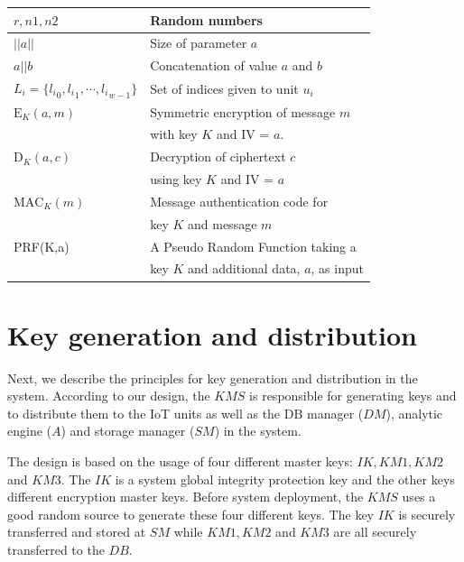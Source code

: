 {\begin{table}[th]
\begin{tabular}{||l|l||}
$r,n1,n2$ & Random numbers \\ \hline
$||a|| $ & Size of parameter $a$\\ \hline
$a||b$ & Concatenation of value $a$ and $b$ \\ \hline
$L_i = \{{l_i}_0, {l_i}_1,\cdots, {l_i}_{w-1}\}$ & Set of indices given to unit $u_i$ \\ \hline
$\text{E}_K(a,m)$ & Symmetric encryption of message $m$ \\
& with key $K$ and IV = $a$. \\ \hline
$\text{D}_{K}(a,c)$ & Decryption of ciphertext $c$ \\
& using key $K$ and IV = $a$\\ \hline
$\text{MAC}_K(m)$ & Message authentication code for \\
& key $K$ and message $m$ \\ \hline
PRF(K,a) & A Pseudo Random Function taking a \\ 
& key $K$ and additional data, $a$, as input \\ \hline
\end{tabular}
\end{table}

\graphicspath{{KeyManagement/images/}}
\section{Key generation and distribution}
\label{keymanagement}
Next, we describe the principles for key generation and distribution in the system. According to our design, the $KMS$ is responsible for generating keys and to distribute them to the IoT units as well as the DB manager ($DM$), analytic engine ($A$) and storage manager ($SM$) in the system. 

The design is based on the usage of four different master keys: $IK, KM1, KM2$ and $KM 3$. The $IK$ is a system global integrity protection key and the other keys different encryption master keys. Before system deployment, the $KMS$ uses a good random source to generate these four different keys. The key $IK$ is securely transferred and stored at $SM$ while $KM1, KM2$ and $KM3$ are all securely transferred to the $DB$.

}
